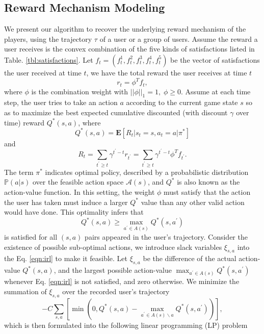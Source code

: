 \documentclass{sigchi}
\begin{document}
\subsection{Reward Mechanism Modeling}

We present our algorithm to recover the underlying reward mechanism of the players, using the trajectory $\tau$ of a user or a group of users.
Assume the reward a user receives is the convex combination of the five kinds of satisfactions listed in Table. \ref{tbl:satisfactions}.
Let $f_t=(f_t^1,f_t^2,f_t^3,f_t^4,f_t^5)$ be the vector of satisfactions the user received at time $t$, we have the total reward the user receives at time $t$
\begin{equation*}
r_t=\phi^Tf_t,
\end{equation*}
where $\phi$ is the combination weight with $||\phi||_1=1, \; \phi \geq 0$.
Assume at each time step, the user tries to take an action $a$ according to the current game state $s$ so as to maximize the best expected cumulative discounted (with discount $\gamma$ over time) reward $Q^\ast(s, a)$, where
$$Q^\ast(s,a)=\mathbf{E}[R_t | s_{t}=s, a_{t}=a | \pi^\ast]$$
and
$$R_t=\sum_{t^\prime\geq t}\gamma^{t^\prime-t}r_{t^\prime}=\sum_{t^\prime\geq t}\gamma^{t^\prime-t}\phi^Tf_{t^\prime}.$$
The term $\pi^\ast$ indicates optimal policy, described by a probabilistic distribution $\mathbb{P}(a|s)$ over the feasible action space $\mathcal{A}(s)$, and $Q^\ast$ is also known as the action-value function.
In this setting, the weight $\phi$ must satisfy that the action the user has taken must induce a larger $Q^\ast$ value than any other valid action would have done.
This optimality infers that
\begin{equation}
Q^\ast(s,a) \geq \max_{a^\prime \in A(s)}Q^\ast(s,a^\prime)
\label{eqn:irl}
\end{equation}
is satisfied for all $(s,a)$ pairs appeared in the user's trajectory.
Consider the existence of possible sub-optimal actions, we introduce slack variables $\xi_{s,a}$ into the Eq. \eqref{eqn:irl} to make it feasible.
Let $\xi_{s,a}$ be the difference of the actual action-value $Q^\ast(s,a)$, and the largest possible action-value $\max_{a^\prime \in A(s)}Q^\ast(s,a^\prime)$ whenever Eq. \eqref{eqn:irl} is not satisfied, and zero otherwise.
We minimize the summation of $\xi_{s,a}$ over the recorded user's trajectory
\begin{equation}
-C\sum_{s,a} \left[\min(0, Q^\ast(s,a) - \max_{a^\prime \in A(s)\backslash a}Q^\ast(s,a^\prime))\right], \label{eqn:slack}
\end{equation}
which is then formulated into the following linear programming (LP) problem
\end{document}
